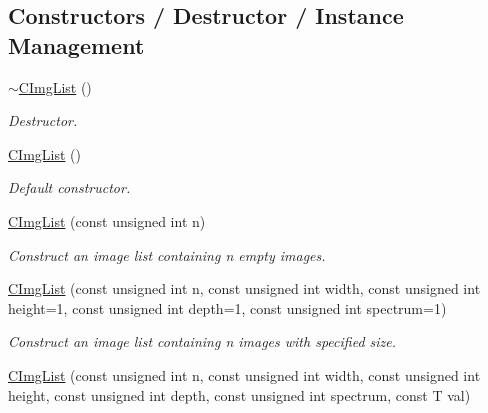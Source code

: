 \subsection*{Constructors / Destructor / Instance Management}
\label{_amgrp40aea8b807100c67fa0d7b630c9c7060}
 \begin{DoxyCompactItemize}
\item 
\hypertarget{structcimg__library_1_1CImgList_a30a624e43eb40c6df0fa1fdacf5c6235}{
\hyperlink{structcimg__library_1_1CImgList_a30a624e43eb40c6df0fa1fdacf5c6235}{$\sim$CImgList} ()}
\label{structcimg__library_1_1CImgList_a30a624e43eb40c6df0fa1fdacf5c6235}

\begin{DoxyCompactList}\small\item\em Destructor. \item\end{DoxyCompactList}\item 
\hypertarget{structcimg__library_1_1CImgList_ad9806b5302d100f40e74c2ca0e0616d1}{
\hyperlink{structcimg__library_1_1CImgList_ad9806b5302d100f40e74c2ca0e0616d1}{CImgList} ()}
\label{structcimg__library_1_1CImgList_ad9806b5302d100f40e74c2ca0e0616d1}

\begin{DoxyCompactList}\small\item\em Default constructor. \item\end{DoxyCompactList}\item 
\hypertarget{structcimg__library_1_1CImgList_a32d594cbd3687a11f87b96be504e54ba}{
\hyperlink{structcimg__library_1_1CImgList_a32d594cbd3687a11f87b96be504e54ba}{CImgList} (const unsigned int n)}
\label{structcimg__library_1_1CImgList_a32d594cbd3687a11f87b96be504e54ba}

\begin{DoxyCompactList}\small\item\em Construct an image list containing n empty images. \item\end{DoxyCompactList}\item 
\hypertarget{structcimg__library_1_1CImgList_ae90e30ddf28f1b1af7f7402b377a1580}{
\hyperlink{structcimg__library_1_1CImgList_ae90e30ddf28f1b1af7f7402b377a1580}{CImgList} (const unsigned int n, const unsigned int width, const unsigned int height=1, const unsigned int depth=1, const unsigned int spectrum=1)}
\label{structcimg__library_1_1CImgList_ae90e30ddf28f1b1af7f7402b377a1580}

\begin{DoxyCompactList}\small\item\em Construct an image list containing n images with specified size. \item\end{DoxyCompactList}\item 
\hypertarget{structcimg__library_1_1CImgList_a5a1fe85d7d944e9cc92094869bafd1c5}{
\hyperlink{structcimg__library_1_1CImgList_a5a1fe85d7d944e9cc92094869bafd1c5}{CImgList} (const unsigned int n, const unsigned int width, const unsigned int height, const unsigned int depth, const unsigned int spectrum, const T val)}
\label{structcimg__library_1_1CImgList_a5a1fe85d7d944e9cc92094869bafd1c5}


\end{DoxyCompactItemize}
